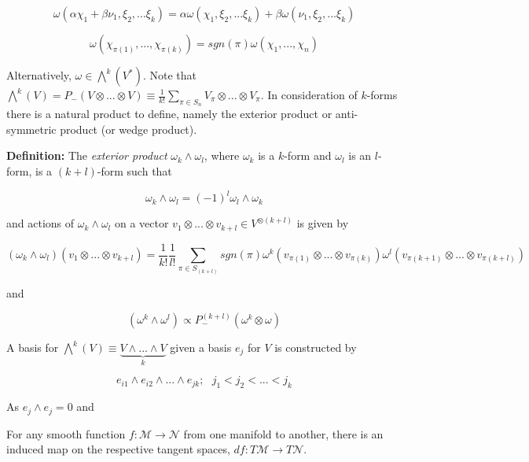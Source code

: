 \documentclass{article}\usepackage[]{graphicx}\usepackage[]{color}
\newcommand{\M}{\mathcal{M}}
\begin{document}
 $$
 \omega (\alpha \chi_1 + \beta \nu_1,\xi_2,...\xi_k )=\alpha \omega (\chi_1,\xi_2,...\xi_k )+\beta \omega (\nu_1,\xi_2,...\xi_k )
 $$
 
\begin{center}

\end{center} 
 
$$
\omega(\chi_{\pi(1)},...,\chi_{\pi(k)})=sgn(\pi) \omega(\chi_1,...,\chi_n)
$$ 
 
Alternatively, $\omega\in\bigwedge^k(V^*)$. Note that $\bigwedge^k(V)=P_-(V\otimes...\otimes V)\equiv \frac{1}{k!}\sum_{\pi\in S_n}V_{\pi}\otimes ... \otimes V_{\pi}$. In consideration of $k$-forms there is a natural product to define, namely the exterior product or anti-symmetric product 
 (or wedge product).
 
\textbf{Definition:} The \textit{exterior product} $\omega_k\wedge \omega_l$, where $\omega_k$ is a $k$-form and $\omega_l$ is an $l$-form, is a $(k+l)$-form such that 

$$
\omega_k\wedge\omega_l=(-1)^l \omega_l\wedge\omega_k
$$
 
and actions of $\omega_k\wedge \omega_l$ on a vector $v_1\otimes ... \otimes v_{k+l}\in V^{\otimes(k+l)}$ is given by 

$$
(\omega_k\wedge \omega_l)(v_1\otimes ... \otimes v_{k+l})=\frac{1}{k!}\frac{1}{l!}\sum_
{\pi\in S_{(k+l)}}sgn(\pi )\omega^k(v_{\pi(1)}\otimes ... \otimes v_{\pi(k)})\omega^l(v_{\pi(k+1)}\otimes ... \otimes v_{\pi(k+l)})
$$  
 
and 

$$ 
 (\omega^k\wedge\omega^l)\propto P^{(k+l)}_{-}(\omega^k\otimes\omega )
$$
 
A basis for $\bigwedge^{k}(V)\equiv \underbrace{ V\wedge ...\wedge V}_k$ given a basis $e
 _j$ for $V$ is constructed by

$$
e_{i1}\wedge e_{i2}\wedge... \wedge e_{jk}; \ \ \ j_1 < j_2<...<j_k
$$

As $e_j\wedge e_j=0$ and 


For any smooth function $f:\M\rightarrow\mathcal{N}$ from one manifold to another, there is an induced map on the respective tangent spaces, $df:T\M\rightarrow T\mathcal{N}$.

\begin{center}



\end{center}

 
\pagebreak
\end{document}
